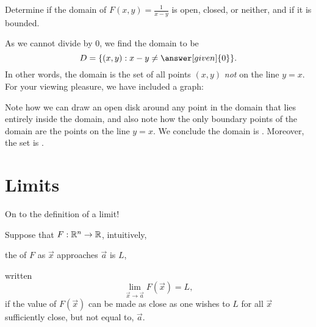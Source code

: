\documentclass{ximera}
\begin{document}
\begin{example}
  Determine if the domain of $F(x,y) = \frac{1}{x-y}$ is open, closed,
  or neither, and if it is bounded.
  \begin{explanation}
    As we cannot divide by $0$, we find the domain to be
    \[
    D = \{(x,y):x-y\neq \answer[given]{0}\}.
    \]
    In other words, the domain is the set of all points $(x,y)$
    \textit{not} on the line $y=x$. For your viewing pleasure, we have
    included a graph:
    \begin{image}
    \end{image}
    Note how we can draw an open disk around any point in the domain
    that lies entirely inside the domain, and also note how the only
    boundary points of the domain are the points on the line $y=x$. We
    conclude the domain is . Moreover, the set is .
  \end{explanation}
\end{example}

\section{Limits}

On to the definition of a limit!

\begin{definition}
 Suppose that $F:\mathbb R^n\to\mathbb R$, intuitively,
  \begin{center}
    the  of $F$ as $\vec{x}$ approaches $\vec{a}$ is $L$,
  \end{center}
  written
  \[
  \lim_{\vec{x}\to \vec{a}} F(\vec{x}) = L,
  \]
  if the value of $F(\vec{x})$ can be made as close as one wishes to $L$ for
  all $\vec{x}$ sufficiently close, but not equal to, $\vec{a}$.
\end{definition}
\end{document}
